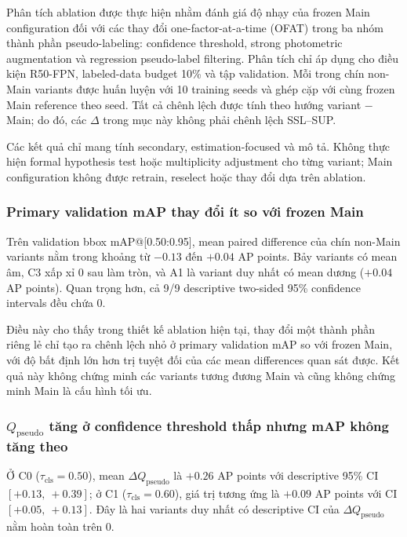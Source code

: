 \documentclass[pdflatex,sn-mathphys-num]{sn-jnl}%
\theoremstyle{thmstyleone}%
\theoremstyle{thmstyletwo}%
\theoremstyle{thmstylethree}%
\begin{document}
Phân tích ablation được thực hiện nhằm đánh giá độ nhạy của frozen Main configuration đối với các thay đổi one-factor-at-a-time (OFAT) trong ba nhóm thành phần pseudo-labeling: confidence threshold, strong photometric augmentation và regression pseudo-label filtering. Phân tích chỉ áp dụng cho điều kiện R50-FPN, labeled-data budget 10\% và tập validation. Mỗi trong chín non-Main variants được huấn luyện với 10 training seeds và ghép cặp với cùng frozen Main reference theo seed. Tất cả chênh lệch được tính theo hướng variant $-$ Main; do đó, các $\Delta$ trong mục này không phải chênh lệch SSL--SUP.

Các kết quả chỉ mang tính secondary, estimation-focused và mô tả. Không thực hiện formal hypothesis test hoặc multiplicity adjustment cho từng variant; Main configuration không được retrain, reselect hoặc thay đổi dựa trên ablation.

\subsubsection{Primary validation mAP thay đổi ít so với frozen Main}

Trên validation bbox mAP@[0.50:0.95], mean paired difference của chín non-Main variants nằm trong khoảng từ $-0.13$ đến $+0.04$ AP points. Bảy variants có mean âm, C3 xấp xỉ 0 sau làm tròn, và A1 là variant duy nhất có mean dương ($+0.04$ AP points). Quan trọng hơn, cả 9/9 descriptive two-sided 95\% confidence intervals đều chứa 0.

Điều này cho thấy trong thiết kế ablation hiện tại, thay đổi một thành phần riêng lẻ chỉ tạo ra chênh lệch nhỏ ở primary validation mAP so với frozen Main, với độ bất định lớn hơn trị tuyệt đối của các mean differences quan sát được. Kết quả này không chứng minh các variants tương đương Main và cũng không chứng minh Main là cấu hình tối ưu.

\subsubsection{$Q_{\mathrm{pseudo}}$ tăng ở confidence threshold thấp nhưng mAP không tăng theo}

Ở C0 ($\tau_{\mathrm{cls}}=0.50$), mean $\Delta Q_{\mathrm{pseudo}}$ là $+0.26$ AP points với descriptive 95\% CI $[+0.13,\ +0.39]$; ở C1 ($\tau_{\mathrm{cls}}=0.60$), giá trị tương ứng là $+0.09$ AP points với CI $[+0.05,\ +0.13]$. Đây là hai variants duy nhất có descriptive CI của $\Delta Q_{\mathrm{pseudo}}$ nằm hoàn toàn trên 0.
\end{document}
